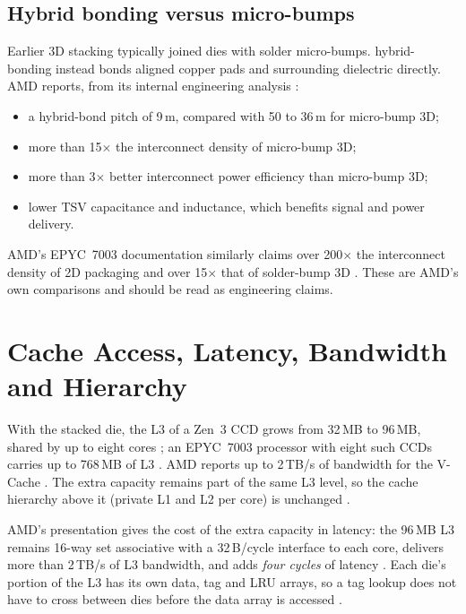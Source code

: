 \subsection{Hybrid bonding versus micro-bumps}
Earlier 3D stacking typically joined dies with solder \glspl{micro-bump}. \Gls{hybrid-bonding} instead bonds aligned copper pads and surrounding dielectric directly. AMD reports, from its internal engineering analysis \cite{swaminathanAdvancedPackagingEnabling2021}:
\begin{itemize}
  \item a hybrid-bond pitch of 9\,\textmu m, compared with 50 to 36\,\textmu m for micro-bump 3D;
  \item more than 15$\times$ the interconnect density of micro-bump 3D;
  \item more than 3$\times$ better interconnect power efficiency than micro-bump 3D;
  \item lower TSV capacitance and inductance, which benefits signal and power delivery.
\end{itemize}
AMD's EPYC~7003 documentation similarly claims over 200$\times$ the interconnect density of 2D packaging and over 15$\times$ that of solder-bump 3D \cite{amd2022epyc7003}. These are AMD's own comparisons and should be read as engineering claims.


\section{Cache Access, Latency, Bandwidth and Hierarchy}
\label{sec:vcache-access}

With the stacked die, the L3 of a Zen~3 CCD grows from 32\,MB to 96\,MB, shared by up to eight cores \cite{wuu2022vcache,amd2022epyc7003}; an EPYC~7003 processor with eight such CCDs carries up to 768\,MB of L3 \cite{amd2022epyc7003}. AMD reports up to 2\,TB/s of bandwidth for the V-Cache \cite{wuu2022vcache}. The extra capacity remains part of the same L3 level, so the cache hierarchy above it (private L1 and L2 per core) is unchanged \cite{amd2022epyc7003}.

AMD's presentation gives the cost of the extra capacity in latency: the 96\,MB L3 remains 16-way set associative with a 32\,B/cycle interface to each core, delivers more than 2\,TB/s of L3 bandwidth, and adds \emph{four cycles} of latency \cite[slide~20]{wuu2022vcache}. Each die's portion of the L3 has its own data, tag and LRU arrays, so a tag lookup does not have to cross between dies before the data array is accessed \cite[slide~20]{wuu2022vcache}.

